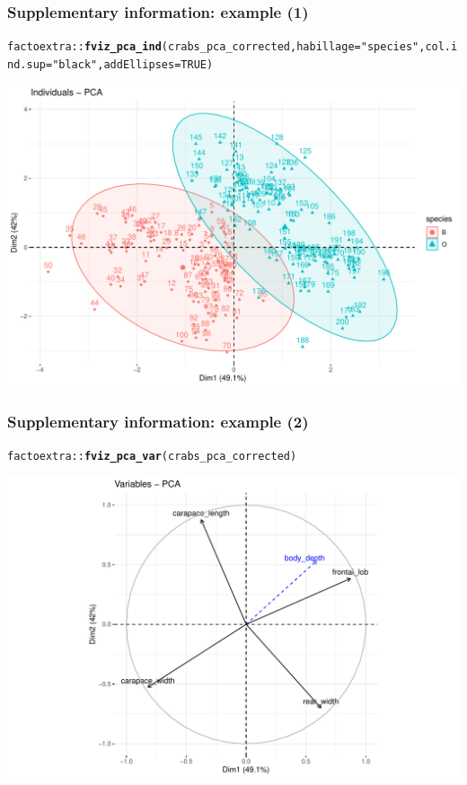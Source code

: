 \documentclass{beamer}\usepackage[]{graphicx}\usepackage[]{color}
\makeatletter
\newcommand{\hlnum}[1]{\textcolor[rgb]{0.686,0.059,0.569}{#1}}%
\newcommand{\hlstr}[1]{\textcolor[rgb]{0.192,0.494,0.8}{#1}}%
\newcommand{\hlopt}[1]{\textcolor[rgb]{0,0,0}{#1}}%
\newcommand{\hlstd}[1]{\textcolor[rgb]{0.345,0.345,0.345}{#1}}%
\newcommand{\hlkwc}[1]{\textcolor[rgb]{0.333,0.667,0.333}{#1}}%
\newcommand{\hlkwd}[1]{\textcolor[rgb]{0.737,0.353,0.396}{\textbf{#1}}}%
\newenvironment{kframe}{%
 \def\at@end@of@kframe{}%
 \ifinner\ifhmode%
  \def\at@end@of@kframe{\end{minipage}}%
  \begin{minipage}{\columnwidth}%
 \fi\fi%
 \def\FrameCommand##1{\hskip\@totalleftmargin \hskip-\fboxsep
 \colorbox{shadecolor}{##1}\hskip-\fboxsep
     \hskip-\linewidth \hskip-\@totalleftmargin \hskip\columnwidth}%
 \MakeFramed {\advance\hsize-\width
   \@totalleftmargin\z@ \linewidth\hsize
   \@setminipage}}%
 {\par\unskip\endMakeFramed%
 \at@end@of@kframe}
\newenvironment{knitrout}{}{} %
\makeatother
\begin{document}
\begin{frame}[fragile]
\frametitle{Supplementary information: example (1)}
\begin{knitrout}\scriptsize
{}\color{fgcolor}\begin{kframe}
\begin{alltt}
\hlstd{factoextra}\hlopt{::}\hlkwd{fviz_pca_ind}\hlstd{(crabs_pca_corrected,} \hlkwc{habillage} \hlstd{=} \hlstr{"species"}\hlstd{,} \hlkwc{col.ind.sup} \hlstd{=} \hlstr{"black"}\hlstd{,} \hlkwc{addEllipses} \hlstd{=} \hlnum{TRUE}\hlstd{)}
\end{alltt}
\end{kframe}
\includegraphics[width=.8\textwidth]{figures/unnamed-chunk-3-1} 

\end{knitrout}

\end{frame}

\begin{frame}[fragile]
\frametitle{Supplementary information: example (2)}
\begin{knitrout}\scriptsize
{}\color{fgcolor}\begin{kframe}
\begin{alltt}
\hlstd{factoextra}\hlopt{::}\hlkwd{fviz_pca_var}\hlstd{(crabs_pca_corrected)}
\end{alltt}
\end{kframe}
\includegraphics[width=.8\textwidth]{figures/unnamed-chunk-4-1} 

\end{knitrout}

\end{frame}
\end{document}
